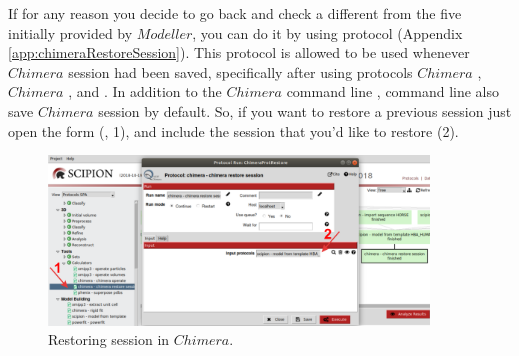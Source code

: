 If for any reason you decide to go back and check a different  from the five  initially provided by $Modeller$, you can do it by using  protocol (Appendix \ref{app:chimeraRestoreSession}). This protocol is allowed to be used whenever $Chimera$ session had been saved, specifically after using protocols $Chimera$ , $Chimera$ , and \scipion {}. In addition to the $Chimera$ command line , command line  also save $Chimera$ session by default. So, if you want to restore a previous session just open the form (, 1), and include the session that you'd like to restore (2).

 \begin{figure}[H]
  \centering 
  \captionsetup{width=.7\linewidth} 
  \includegraphics[width=0.90\textwidth]{Images/Fig17.png}
  \caption{Restoring session in $Chimera$.}
  \label{fig:restore_session_protocol}
  \end{figure}
